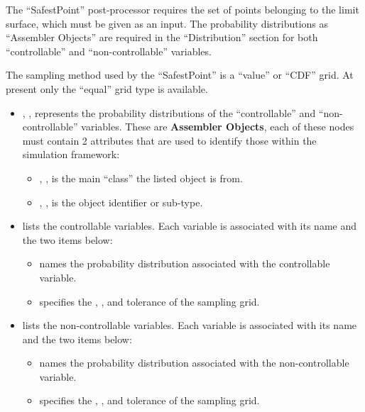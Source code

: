 The ``SafestPoint'' post-processor requires the set of points belonging to the
limit surface, which must be given as an input.
%
The probability distributions as ``Assembler Objects'' are required in the
``Distribution'' section for both ``controllable'' and ``non-controllable''
variables.

The sampling method used by the ``SafestPoint'' is a ``value'' or ``CDF'' grid.
%
At present only the ``equal'' grid type is available.


\begin{itemize}
  \item {}, , represents the probability
  distributions of the ``controllable'' and ``non-controllable'' variables.
  These are \textbf{Assembler Objects}, each of these nodes must contain 2
  attributes that are used to identify those within the simulation framework:
        \begin{itemize}
    \item {}, , is the main
    ``class'' the listed object is from.
                \item {}, , is the object
    identifier or sub-type.
        \end{itemize}
        \item {} lists the controllable variables.
  Each variable is associated with its name and the two items below:
        \begin{itemize}
                \item {} names the probability distribution associated
    with the controllable variable.
                \item {} specifies the , , and
    tolerance of the sampling grid.
        \end{itemize}
        \item {} lists the non-controllable variables.
  Each variable is associated with its name and the two items below:
        \begin{itemize}
                \item {} names the probability distribution associated
    with the non-controllable variable.
                \item {} specifies the , , and
    tolerance of the sampling grid.
                \end{itemize}
\end{itemize}

